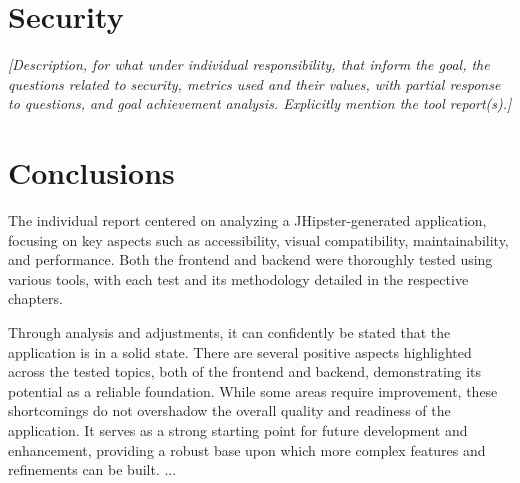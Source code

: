 \documentclass[a4paper,11pt,openright,BCOR=15mm]{scrbook}
\begin{document}
	\chapter{Security}
\textit{	[Description, for what under individual responsibility, that inform the goal, the questions related to security, metrics used and their values, with partial response to questions, and goal achievement analysis. Explicitly mention the tool report(s).]}
		


	\chapter{Conclusions }
	The individual report centered on analyzing a JHipster-generated application, focusing on key aspects such as accessibility, visual compatibility, maintainability, and performance. Both the frontend and backend were thoroughly tested using various tools, with each test and its methodology detailed in the respective chapters.

Through analysis and adjustments, it can confidently be stated that the application is in a solid state. There are several positive aspects highlighted across the tested topics, both of the frontend and backend, demonstrating its potential as a reliable foundation. While some areas require improvement, these shortcomings do not overshadow the overall quality and readiness of the application. It serves as a strong starting point for future development and enhancement, providing a robust base upon which more complex features and refinements can be built.
 ...\newline



	
	
	\renewcommand\bibname{References}
	
	\label{references}
	
\end{document}
